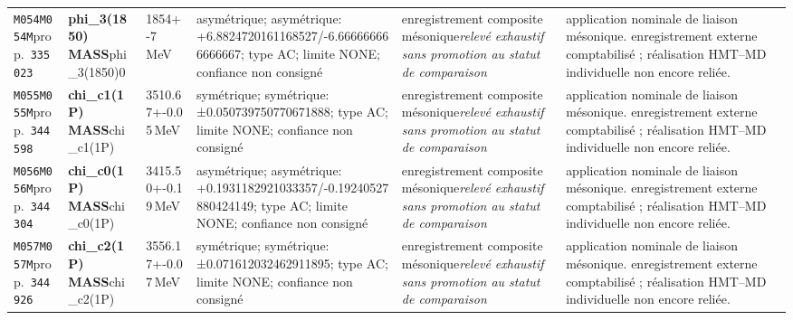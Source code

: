 \begin{landscape}
\begin{longtable}{L{1.85cm}L{4.45cm}L{2.35cm}L{4.05cm}L{3.35cm}L{7.15cm}}
\texttt{M054}\newline \texttt{M054M}\newline prop.\ \texttt{335023} & \textbf{phi\_\allowbreak{}3(1850) MASS}\newline phi\_\allowbreak{}3(1850)0 & 1854+-7\,MeV & asymétrique; asymétrique: +6.8824720161168527/-6.666666666666667; type AC; limite NONE; confiance non consigné & enregistrement composite mésonique\newline \emph{relevé exhaustif sans promotion au statut de comparaison} & application nominale de liaison mésonique. enregistrement externe comptabilisé ; réalisation HMT--MD individuelle non encore reliée. \\
\texttt{M055}\newline \texttt{M055M}\newline prop.\ \texttt{344598} & \textbf{chi\_\allowbreak{}c1(1P) MASS}\newline chi\_\allowbreak{}c1(1P) & 3510.67+-0.05\,MeV & symétrique; symétrique: ±0.050739750770671888; type AC; limite NONE; confiance non consigné & enregistrement composite mésonique\newline \emph{relevé exhaustif sans promotion au statut de comparaison} & application nominale de liaison mésonique. enregistrement externe comptabilisé ; réalisation HMT--MD individuelle non encore reliée. \\
\texttt{M056}\newline \texttt{M056M}\newline prop.\ \texttt{344304} & \textbf{chi\_\allowbreak{}c0(1P) MASS}\newline chi\_\allowbreak{}c0(1P) & 3415.50+-0.19\,MeV & asymétrique; asymétrique: +0.1931182921033357/-0.19240527880424149; type AC; limite NONE; confiance non consigné & enregistrement composite mésonique\newline \emph{relevé exhaustif sans promotion au statut de comparaison} & application nominale de liaison mésonique. enregistrement externe comptabilisé ; réalisation HMT--MD individuelle non encore reliée. \\
\texttt{M057}\newline \texttt{M057M}\newline prop.\ \texttt{344926} & \textbf{chi\_\allowbreak{}c2(1P) MASS}\newline chi\_\allowbreak{}c2(1P) & 3556.17+-0.07\,MeV & symétrique; symétrique: ±0.071612032462911895; type AC; limite NONE; confiance non consigné & enregistrement composite mésonique\newline \emph{relevé exhaustif sans promotion au statut de comparaison} & application nominale de liaison mésonique. enregistrement externe comptabilisé ; réalisation HMT--MD individuelle non encore reliée. \\

\end{longtable}
\end{landscape}
